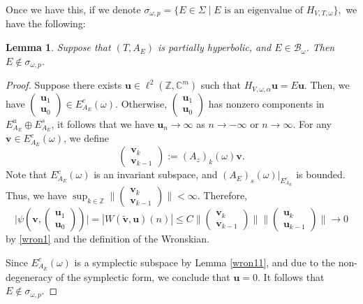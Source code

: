 \documentclass[11pt]{amsart}
\newtheorem{lemma}[theorem]{Lemma}
\theoremstyle{remark}
\theoremstyle{definition}
\begin{document}
Once we have this, if we denote $\sigma_{\omega,p} = \{E \in \Sigma \mid E \text{ is an eigenvalue of } H_{V,T,\omega}\},$ we have the following: 
\begin{lemma}\label{wron}
Suppose that $(T,A_E)$ is partially hyperbolic, and \(E \in \mathcal{B}_\omega\). Then \(E \notin \sigma_{\omega,p} \).
\end{lemma}
\begin{proof} Suppose there exists $\mathbf{u} \in \ell^2(\mathbb{Z}, \mathbb{C}^m)$ such that $H_{V,\omega,\alpha} \mathbf{u} = E \mathbf{u}$. Then, we have $\begin{pmatrix}
\mathbf{u}_1 \\
\mathbf{u}_0
\end{pmatrix} \in E_{A_E}^c(\omega).$ Otherwise, 
 $\begin{pmatrix}
\mathbf{u}_1 \\
\mathbf{u}_0
\end{pmatrix}$  has nonzero components in $ E^u_{A_E} \oplus E^s_{A_E}$, it follows that 
we have $\mathbf{u}_n \to \infty$ as $n \to -\infty$ or $n \to \infty.$
For any $\mathbf{v} \in E_{A_E}^c(\omega)$, we define
$$
\begin{pmatrix}
\mathbf{v}_k \\
\mathbf{v}_{k-1}
\end{pmatrix} := (A_z)_{k}(\omega) \mathbf{v}.
$$
Note that $E_{A_E}^c(\omega)$ is an invariant subspace, and $(A_E)_{s}(\omega)|_{E_{A_E}^c}$ is bounded. Thus, we have
$
\sup_{k \in \mathbb{Z}} \bigg\|\begin{pmatrix}
\mathbf{v}_k \\
\mathbf{v}_{k-1}
\end{pmatrix}\bigg\| < \infty.
$
Therefore,
$$
\bigg|\psi\left(\mathbf{v}, \begin{pmatrix}
\mathbf{u}_1 \\
\mathbf{u}_0
\end{pmatrix}\right)\bigg| = |W(\tilde{\mathbf{v}}, \mathbf{u})(n)| \leq C \bigg\|\begin{pmatrix}
\mathbf{v}_k \\
\mathbf{v}_{k-1}
\end{pmatrix}\bigg\| \bigg\|\begin{pmatrix}
\mathbf{u}_k \\
\mathbf{u}_{k-1}
\end{pmatrix}\bigg\| \to 0
$$
by \eqref{wron1} and the definition of the Wronskian.

Since $E_{A_E}^c(\omega)$ is a symplectic subspace by Lemma \ref{wron11}, and due to the non-degeneracy of the symplectic form, we conclude that $\mathbf{u} = 0.$ It follows that \(E \notin \sigma_{\omega,p} \). \end{proof}
\end{document}
